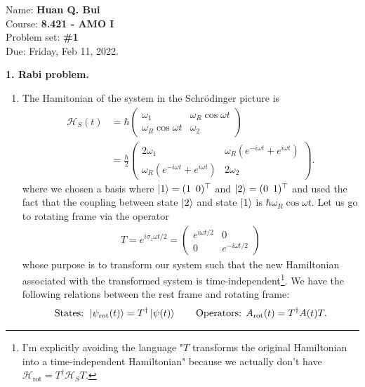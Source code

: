 \documentclass{article}
\theoremstyle{definition}
\newcommand{\ham}{\mathcal{H}}
\newcommand{\f}[2]{\frac{#1}{#2}}
\begin{document}
\begin{framed}
\noindent Name: \textbf{Huan Q. Bui}\\
Course: \textbf{8.421 - AMO I}\\
Problem set: \textbf{\#1}\\
Due: Friday, Feb 11, 2022.
\end{framed}
	
	
\noindent \textbf{1. Rabi problem.}


\begin{enumerate}[label=\alph*)]
	\item The Hamitonian of the system in the Schr\"{o}dinger picture is 
	\begin{align*}
	\ham_S(t) &= \hbar \begin{pmatrix}
	\omega_1 & \omega_R \cos \omega t \\ \omega_R \cos\omega t & \omega_2
	\end{pmatrix} \\
	&= \f{\hbar}{2} \begin{pmatrix}
	2\omega_1 & \omega_R (e^{-i\omega t} + e^{i\omega t}) \\ \omega_R (e^{-i\omega t} + e^{i\omega t}) & 2\omega_2
	\end{pmatrix}.
	\end{align*}
	where we chosen a basis where $\ket{1} = (1 \,\,\, 0)^\top$ and $\ket{2} = (0 \,\,\, 1)^\top$ and used the fact that the coupling between state $\ket{2}$ and state $\ket{1}$ is $\hbar \omega_R \cos\omega t$. Let us go to rotating frame via the operator
	\begin{align*}
	T = e^{i\sigma_z \omega t/2} = \begin{pmatrix}
	e^{i\omega t/2} &  0 \\0  & e^{-i\omega t/2}
	\end{pmatrix} 
	\end{align*}
	whose purpose is to transform our system such that the new Hamiltonian associated with the transformed system is time-independent\footnote{I'm explicitly avoiding the language "$T$ transforms the original Hamiltonian into a time-independent Hamiltonian" because we actually don't have $\ham_\text{rot} = T^\dagger \ham_S T$.}.  We have the following relations between the rest frame and rotating frame:
	\begin{align*}
	\text{States: } \ket{\psi_\text{rot}(t)} = T^\dagger \ket{\psi(t)} \quad\quad \text{Operators: }  A_\text{rot}(t) = T^\dagger A(t) T.
	\end{align*}
	

\end{enumerate}
\end{document}
